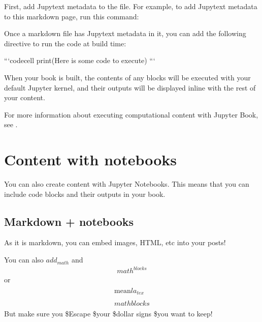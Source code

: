 \documentclass[letterpaper,10pt,english]{jupyterBook}
\begin{document}
\sphinxAtStartPar
First, add Jupytext metadata to the file. For example, to add Jupytext metadata
to this markdown page, run this command:

\begin{sphinxVerbatim}[commandchars=\\\{\}]
   
\end{sphinxVerbatim}

\sphinxAtStartPar
Once a markdown file has Jupytext metadata in it, you can add the following
directive to run the code at build time:

\begin{sphinxVerbatim}[commandchars=\\\{\}]
```\PYGZob{}code\PYGZhy{}cell\PYGZcb{}
print(\PYGZdq{}Here is some code to execute\PYGZdq{})
```
\end{sphinxVerbatim}

\sphinxAtStartPar
When your book is built, the contents of any  blocks will be
executed with your default Jupyter kernel, and their outputs will be displayed
in\sphinxhyphen{}line with the rest of your content.

\sphinxAtStartPar
For more information about executing computational content with Jupyter Book,
see .


\chapter{Content with notebooks}
\label{\detokenize{notebooks:content-with-notebooks}}\label{\detokenize{notebooks::doc}}
\sphinxAtStartPar
You can also create content with Jupyter Notebooks. This means that you can include
code blocks and their outputs in your book.


\section{Markdown + notebooks}
\label{\detokenize{notebooks:markdown-notebooks}}
\sphinxAtStartPar
As it is markdown, you can embed images, HTML, etc into your posts!

\sphinxAtStartPar


\sphinxAtStartPar
You can also \(add_{math}\) and
\begin{equation*}
\begin{split}
math^{blocks}
\end{split}
\end{equation*}
\sphinxAtStartPar
or
\begin{equation*}
\begin{split}
\begin{aligned}
\mbox{mean} la_{tex} \\ \\
math blocks
\end{aligned}
\end{split}
\end{equation*}
\sphinxAtStartPar
But make sure you \$Escape \$your \$dollar signs \$you want to keep!
\end{document}
